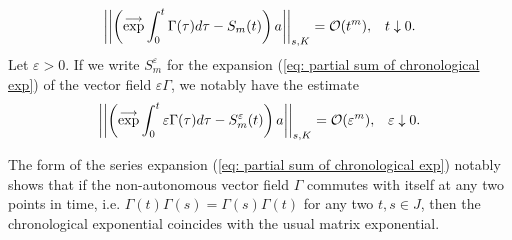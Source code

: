 \begin{align}
\left | \left | \left (\overset{\longrightarrow}{\exp} \int_0^t \Gamma(\tau) d\tau - S_m(t) \right )a\right |\right |_{s, K} = \mathcal{O}(t^m),& &  t \downarrow 0.
\end{align}
Let $\varepsilon > 0$. If we write $S_m^\varepsilon$ for the expansion (\ref{eq: partial sum of chronological exp}) of the vector field $\varepsilon \Gamma$, we notably have the estimate
\begin{align}
\label{eq: estimation of chronological exponential}
\left | \left | \left (\overset{\longrightarrow}{\exp} \int_0^t \varepsilon \Gamma(\tau) d\tau - S_m^\varepsilon(t) \right )a\right |\right |_{s, K} = \mathcal{O}(\varepsilon^m),& &  \varepsilon \downarrow 0.
\end{align}

\begin{remark}
The form of the series expansion (\ref{eq: partial sum of chronological exp}) notably shows that if the non-autonomous vector field $\Gamma$ commutes with itself at any two points in time, i.e. $\Gamma(t)\Gamma(s) = \Gamma(s) \Gamma(t)$ for any two $t,s \in J$, then the chronological exponential coincides with the usual matrix exponential.
\end{remark}

